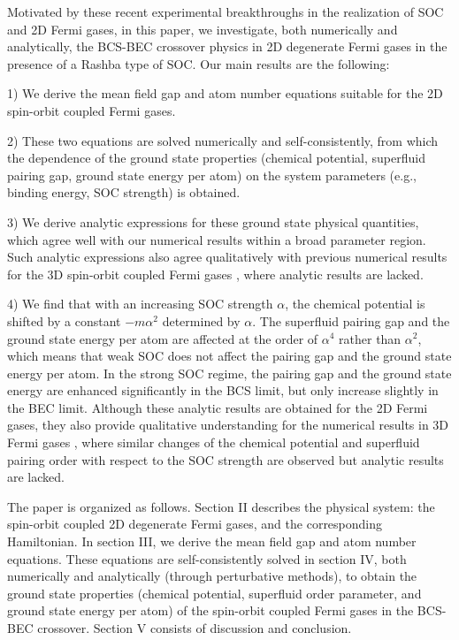 \documentclass[pra,print,showpacs,superscriptaddress,twocolumn]{revtex4}
\begin{document}
Motivated by these recent experimental breakthroughs in the realization of
SOC and 2D Fermi gases, in this paper, we investigate, both numerically and
analytically, the BCS-BEC crossover physics in 2D degenerate Fermi gases in
the presence of a Rashba type of SOC. Our main results are the following:

1) We derive the mean field gap and atom number equations suitable for the
2D spin-orbit coupled Fermi gases.

2) These two equations are solved numerically and self-consistently, from
which the dependence of the ground state properties (chemical potential,
superfluid pairing gap, ground state energy per atom) on the system
parameters (e.g., binding energy, SOC strength) is obtained.

3) We derive analytic expressions for these ground state physical
quantities, which agree well with our numerical results within a broad
parameter region. Such analytic expressions also agree qualitatively with
previous numerical results for the 3D spin-orbit coupled Fermi gases \cite%
{3DF}, where analytic results are lacked.

4) We find that with an increasing SOC strength $\alpha $, the chemical
potential is shifted by a constant $-m\alpha ^{2}$ determined by $\alpha $.
The superfluid pairing gap and the ground state energy per atom are affected
at the order of $\alpha ^{4}$ rather than $\alpha ^{2}$, which means that
weak SOC does not affect the pairing gap and the ground state energy per
atom. In the strong SOC regime, the pairing gap and the ground state energy
are enhanced significantly in the BCS limit, but only increase slightly in
the BEC limit. Although these analytic results are obtained for the 2D Fermi
gases, they also provide qualitative understanding for the numerical results
in 3D Fermi gases \cite{3DF}, where similar changes of the chemical
potential and superfluid pairing order with respect to the SOC strength are
observed but analytic results are lacked.

The paper is organized as follows. Section II describes the physical system:
the spin-orbit coupled 2D degenerate Fermi gases, and the corresponding
Hamiltonian. In section III, we derive the mean field gap and atom number
equations. These equations are self-consistently solved in section IV, both
numerically and analytically (through perturbative methods), to obtain the
ground state properties (chemical potential, superfluid order parameter, and
ground state energy per atom) of the spin-orbit coupled Fermi gases in the
BCS-BEC crossover. Section V consists of discussion and conclusion.
\end{document}
